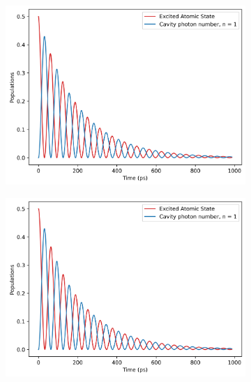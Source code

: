 \documentclass[11pt]{article}
\begin{document}
\begin{figure}[H]
    \centering
    \begin{subfigure}{0.45\textwidth}
        \centering
        \includegraphics[width=\linewidth]{Research Project/Code/results/JCM/OQS_Pop_Spont_eg.png}
        \caption{}
        \label{fig:JCM_OQS_Pop_Spont_eg}
    \end{subfigure}
    \hfill
    \begin{subfigure}{0.45\textwidth}
        \centering
        \includegraphics[width=\linewidth]{Research Project/Code/results/JCM/OQS_Pop_Therm_eg.png}
        \caption{}
        \label{fig:JCM_OQS_Pop_Therm_eg}
    \end{subfigure}
    

\end{figure}
\end{document}
